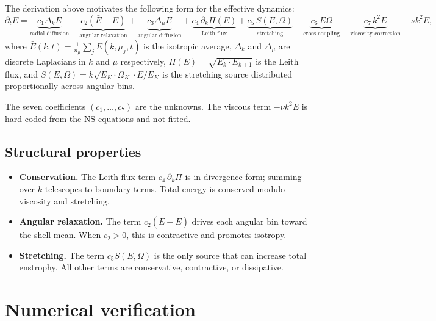 \documentclass[11pt,a4paper]{article}
\theoremstyle{remark}
\begin{document}
The derivation above motivates the following form for the effective dynamics:
\begin{equation}\label{eq:effective-pde}
  \partial_t E = \underbrace{c_1 \Delta_k E}_{\text{radial diffusion}}
    + \underbrace{c_2 (\bar{E} - E)}_{\text{angular relaxation}}
    + \underbrace{c_3 \Delta_\mu E}_{\text{angular diffusion}}
    + \underbrace{c_4 \,\partial_k \Pi(E)}_{\text{Leith flux}}
    + \underbrace{c_5 \, S(E, \Omega)}_{\text{stretching}}
    + \underbrace{c_6 \, E\Omega}_{\text{cross-coupling}}
    + \underbrace{c_7 \, k^2 E}_{\text{viscosity correction}}
    - \nu k^2 E,
\end{equation}
where $\bar{E}(k,t) = \frac{1}{n_\mu}\sum_j E(k,\mu_j,t)$ is the isotropic average, $\Delta_k$ and $\Delta_\mu$ are discrete Laplacians in $k$ and $\mu$ respectively, $\Pi(E) = \sqrt{E_k \cdot E_{k+1}}$ is the Leith flux, and $S(E,\Omega) = k\sqrt{E_K \cdot \Omega_K} \cdot E/E_K$ is the stretching source distributed proportionally across angular bins.

The seven coefficients $(c_1, \ldots, c_7)$ are the unknowns.  The viscous term $-\nu k^2 E$ is hard-coded from the NS equations and not fitted.

\subsection{Structural properties}

\begin{itemize}
\item \textbf{Conservation.}  The Leith flux term $c_4\,\partial_k\Pi$ is in divergence form; summing over $k$ telescopes to boundary terms.  Total energy is conserved modulo viscosity and stretching.
\item \textbf{Angular relaxation.}  The term $c_2(\bar{E} - E)$ drives each angular bin toward the shell mean.  When $c_2 > 0$, this is contractive and promotes isotropy.
\item \textbf{Stretching.}  The term $c_5 S(E,\Omega)$ is the only source that can increase total enstrophy.  All other terms are conservative, contractive, or dissipative.
\end{itemize}

\section{Numerical verification}\label{sec:numerics}
\end{document}
